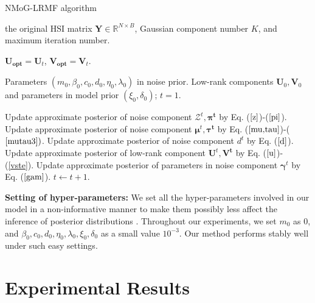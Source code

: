 \documentclass[journal]{IEEEtran}
\renewcommand{\algorithmicensure}{\textbf{Output:}}
\begin{document}
\begin{algorithm}
	\small
	\caption{NMoG-LRMF algorithm}\label{alg1}
	\begin{algorithmic}[1]
		\Require  the original HSI matrix $\bm{Y}\in \mathbb{R}^{N\times B}$, Gaussian component number $ K $, and maximum iteration number.
		
		\Ensure $\mathbf{U_{opt}}=\mathbf{U}_{t}$, $\mathbf{V_{opt}}=\mathbf{V}_{t}$.
		\renewcommand{\algorithmicensure}{\textbf{Initialization:}}
		
		\Ensure Parameters $ (m_0,\beta_0,c_0,d_0 ,\eta_0,\lambda_0) $ in noise prior. Low-rank components $\mathbf{U}_0,\mathbf{V}_0$ and parameters in model prior $ (\xi_0,\delta_0) $; $ t=1 $.
		
		\State Update approximate posterior of noise component $ \mathcal{Z}^t, \bm{\pi^t} $ by Eq. ($ \ref{z} $)-($ \ref{pi} $).		
		\State Update approximate posterior of noise component $ \bm{\mu}^t, \bm{\tau^t} $ by Eq. ($ \ref{mu,tau} $)-($ \ref{mutau3}) $.		
		\State Update approximate posterior of noise component $ d^t $ by Eq. ($ \ref{d} $).		
		\State Update approximate posterior of low-rank \mbox{component} $ \bm{U}^t, \bm{V^t} $ by Eq. ($ \ref{u} $)-(\ref{vste}).			
		\State Update approximate posterior of parameters in noise component $ \bm{\gamma}^t $ by Eq. ($ \ref{gam}$).						
		\small
		\State $t\leftarrow t+1$.
		\EndWhile
	\end{algorithmic}
	\normalsize
\end{algorithm}


\textbf{Setting of hyper-parameters: } We set all the hyper-parameters
involved in our model in a non-informative manner to make them possibly less affect the inference of posterior distributions \cite{bishop2006pattern}. Throughout our experiments, we set $ m_0 $ as 0, and $ \beta_0, c_0, d_0 ,\eta_0, \lambda_0, \xi_0, \delta_0$ as a small value $ 10^{-3} $. Our method performs stably well under such easy settings.


\section{Experimental Results}
\end{document}
